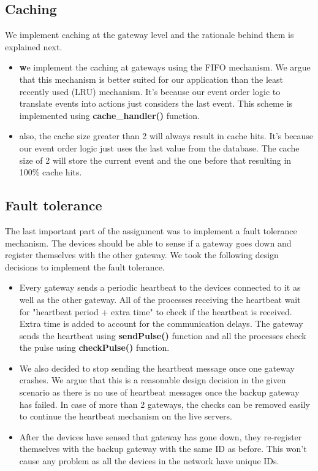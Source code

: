 \documentclass[12pt]{article}
\begin{document}
\subsection{Caching}
We implement caching at the gateway level and the
rationale behind them is explained next.

\begin{itemize}
	\item \textbf we implement the caching at gateways using the FIFO mechanism. 
	We argue that this mechanism is better suited for our application than the least recently used (LRU) 
	mechanism. It's because our event order logic to translate events into actions just considers the last 
	event. This scheme is implemented using \textbf{cache\_handler()} function. 
	\item also, the cache size greater than 2 will always result in cache hits. It's because our event order logic 
	just uses the last value from the database. The cache size of 2 will store the current event and the 
	one before that resulting in 100\% cache hits.  
\end{itemize}

\subsection{Fault tolerance}

The last important part of the assignment 
was to implement a fault tolerance mechanism. 
The devices should be able to sense if a gateway 
goes down and register themselves with the other 
gateway. We took the following design 
decisions to implement the fault tolerance. 
\begin{itemize}
	\item Every gateway sends a periodic heartbeat to the devices	connected to it as well as the other gateway. 
	All of the processes receiving the heartbeat wait for 
	"heartbeat period + extra time" to check if the 
	heartbeat is received. Extra time is added to account 
	for the communication delays. The gateway sends the heartbeat using 
	\textbf{sendPulse()} function and all the processes check the 
	pulse using \textbf{checkPulse()} function.
	\item We also decided to stop sending the heartbeat 
	message once one gateway crashes. We argue that 
	this is a reasonable design decision in the given scenario
	as there is no use of heartbeat messages once the 
	backup gateway has failed. In case of more than 2 gateways, the checks can be removed easily to continue 
	the heartbeat mechanism on the live servers. 
	\item After the devices have sensed that gateway has 
	gone down, they re-register themselves with the backup
	gateway with the same ID as before. This won't cause 
	any problem as all the devices in the network have 
	unique IDs. 
\end{itemize}
\end{document}
